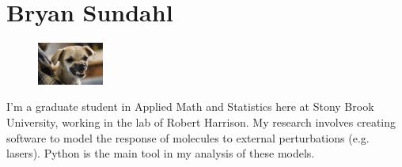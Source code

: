 \documentclass[]{article}
\begin{document}
\section*{Bryan Sundahl} 
\begin{figure}
\begin{centering}
    \includegraphics[width=0.193\textwidth]{grumpy.jpeg}
\end{centering}
\end{figure}
I'm a graduate student in Applied Math and Statistics here at Stony Brook University, working in the lab of Robert Harrison. My research involves creating software to model the response of molecules to external perturbations (e.g. lasers).  Python is the main tool in my analysis of these models. 
\end{document}

